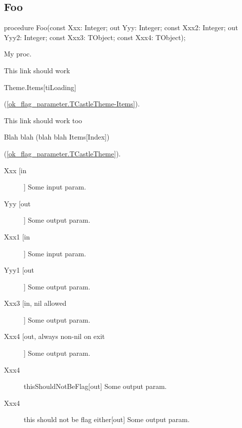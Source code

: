 \documentclass{report}
\newif\ifpdf
\begin{document}
\subsection*{Foo}
\fi
\label{ok_flag_parameter-Foo}
\begin{list}{}{
\setlength{\itemindent}{0cm}
\setlength{\listparindent}{0cm}
\setlength{\leftmargin}{\evensidemargin}
\addtolength{\leftmargin}{\tmplength}
\settowidth{\labelsep}{X}
\addtolength{\leftmargin}{\labelsep}
\setlength{\labelwidth}{\tmplength}
}
\item[\textbf{Declaration}\hfill]
\ifpdf
\begin{flushleft}
\fi
\begin{ttfamily}
procedure Foo(const Xxx: Integer; out Yyy: Integer; const Xxx2: Integer; out Yyy2: Integer; const Xxx3: TObject; const Xxx4: TObject);\end{ttfamily}

\ifpdf
\end{flushleft}
\fi

\par
\item[\textbf{Description}]
My proc.        

This link should work \begin{ttfamily}Theme.Items[tiLoading]\end{ttfamily}(\ref{ok_flag_parameter.TCastleTheme-Items}).

This link should work too \begin{ttfamily}Blah blah (blah blah Items[Index])\end{ttfamily}(\ref{ok_flag_parameter.TCastleTheme}).\par
\item[\textbf{Parameters}]
\begin{description}
\item[Xxx [in]] Some input param.
\item[Yyy [out]] Some output param.
\item[Xxx1 [in]] Some input param.
\item[Yyy1 [out]] Some output param.
\item[Xxx3 [in, nil allowed]] Some output param.
\item[Xxx4 [out, always non{-}nil on exit]] Some output param.
\item[Xxx4] thisShouldNotBeFlag[out] Some output param.
\item[Xxx4] this should not be flag either[out] Some output param.
\end{description}


\end{list}
\ifpdf
\end{document}

